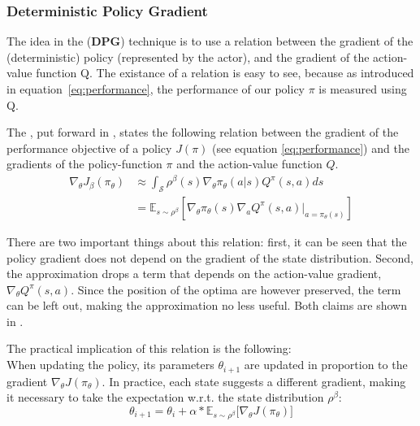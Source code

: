 \subsubsection{Deterministic Policy Gradient}

The idea in the  (\textbf{DPG}) technique is to use a relation between the gradient of the (deterministic) policy (represented by the actor), and the gradient of the action-value function Q. The existance of a relation is easy to see, because as introduced in equation~\ref{eq:performance}, the performance of our policy $\pi$ is measured using Q. 

The , put forward in \cite{silver_deterministic_2014}, states the following relation between the gradient of the performance objective of a policy $J(\pi)$ (see equation \ref{eq:performance}) and the gradients of the policy-function $\pi$ and the action-value function $Q$. 
\begin{align} \label{eq:policygradient}
	\nabla_{\theta}J_\beta(\pi_\theta) &\approx \int_{\mathcal{S}} \rho^\beta(s) \nabla_\theta \pi_{\theta}(a|s)Q^\pi(s,a) ds \nonumber \\
		&= \mathds{E}_{s\sim\rho^\beta} \left[  \nabla_\theta \pi_{\theta}(s) \nabla_a Q^\pi(s,a) \big|_{a=\pi_\theta(s)} \right] 
\end{align}
\begin{flushright}
	\small There are two important things about this relation: first, it can be seen that the policy gradient does not depend on the gradient of the state distribution. Second, the approximation drops a term that depends on the action-value gradient, $\nabla_{\theta} Q^\pi(s,a)$. Since the position of the optima are however preserved, the term can be left  out, making the approximation no less useful. Both claims are shown in \cite{silver_deterministic_2014}.\\ \vspace{9px}
\end{flushright}

\noindent The practical implication of this relation is the following:\\
\noindent When updating the policy, its parameters $\theta_{i+1}$ are updated in proportion to the gradient $\nabla_{\theta}J(\pi_\theta)$. In practice, each state suggests a different gradient, making it necessary to take the expectation w.r.t. the state distribution $\rho^\beta$: 
\begin{equation*}
	\theta_{i+1} = \theta_i + \alpha * \mathds{E}_{s\sim\rho^\beta} \big[ \nabla_{\theta}J(\pi_\theta) \big]
\end{equation*}

